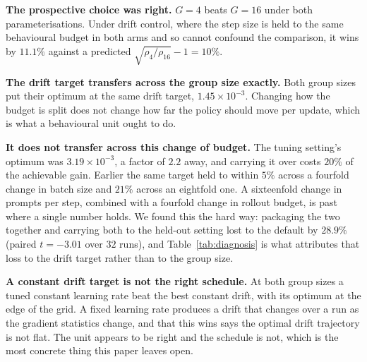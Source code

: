 \begin{table}[t]
  \centering
  \small
  
  \caption{Best achievable gain at the held-out setting, crossing the group size the probe selected
  against the group size a default recipe would use, under both ways of setting the step. Starred
  entries sit at the edge of their grid and are lower bounds. The probe's choice wins under both.}
  \label{tab:diagnosis}
\end{table}

\textbf{The prospective choice was right.} $G = 4$ beats $G = 16$ under both parameterisations.
Under drift control, where the step size is held to the same behavioural budget in both arms and so
cannot confound the comparison, it wins by $11.1\%$ against a predicted
$\sqrt{\rho_4/\rho_{16}} - 1 = 10\%$.

\textbf{The drift target transfers across the group size exactly.} Both group sizes put their
optimum at the same drift target, $1.45 \times 10^{-3}$. Changing how the budget is split does not
change how far the policy should move per update, which is what a behavioural unit ought to do.

\textbf{It does not transfer across this change of budget.} The tuning setting's optimum was
$3.19 \times 10^{-3}$, a factor of $2.2$ away, and carrying it over costs $20\%$ of the achievable
gain. Earlier the same target held to within $5\%$ across a fourfold change in batch size and
$21\%$ across an eightfold one. A sixteenfold change in prompts per step, combined with a fourfold
change in rollout budget, is past where a single number holds. We found this the hard way: packaging
the two together and carrying both to the held-out setting lost to the default by $28.9\%$ (paired
$t = -3.01$ over $32$ runs), and Table~\ref{tab:diagnosis} is what attributes that loss to the drift
target rather than to the group size.

\textbf{A constant drift target is not the right schedule.} At both group sizes a tuned constant
learning rate beat the best constant drift, with its optimum at the edge of the grid. A fixed
learning rate produces a drift that changes over a run as the gradient statistics change, and that
this wins says the optimal drift trajectory is not flat. The unit appears to be right and the
schedule is not, which is the most concrete thing this paper leaves open.
